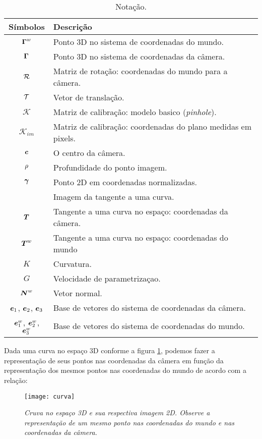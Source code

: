 \begin{table}[!h]
\begin{center}
\begin{tabular}{|c|l|}
\hline
Símbolos&Descrição\\\hline\hline
$\boldsymbol{\Gamma}^w$&Ponto 3D no sistema de coordenadas do mundo.\\\hline
$\boldsymbol{\Gamma}$&Ponto 3D no sistema de coordenadas da câmera.\\\hline
$\mathcal{R}$&Matriz de rotação: coordenadas do mundo para a câmera.\\\hline
$\mathcal{T}$&Vetor de translação.\\\hline
$\mathcal K$&Matriz de calibração: modelo basico (\textit{pinhole}).\\\hline
$\mathcal K_{im}$&Matriz de calibração: coordenadas do plano medidas em pixels.\\\hline
$\boldsymbol{c}$&O centro da câmera.\\\hline
$\rho$&Profundidade do ponto imagem.\\\hline
$\boldsymbol{\gamma}$&Ponto 2D em coordenadas normalizadas.\\\hline
&Imagem da tangente a uma curva.\\\hline
$\boldsymbol{T}$&Tangente a uma curva no espaço: coordenadas da câmera.\\\hline
$\boldsymbol{T}^w$&Tangente a uma curva no espaço: coordenadas do mundo\\\hline
$K$&Curvatura.\\\hline
$G$&Velocidade de parametrizaçao.\\\hline
$\boldsymbol{N}^w$&Vetor normal.\\\hline
$\boldsymbol{e}_1$, $\boldsymbol{e}_2$, $\boldsymbol{e}_3$&Base de vetores do sistema de coordenadas da câmera.\\\hline
$\boldsymbol{e}_1^w$, $\boldsymbol{e}_2^w$, $\boldsymbol{e}_3^w$&Base de vetores do sistema de coordenadas do mundo.\\\hline
\end{tabular}
\end{center}
\caption{Notação.}
\label{tab_not}
\end{table}

Dada uma curva no espaço 3D conforme a figura \ref{curva_3D}, podemos fazer a representação de seus pontos nas coordenadas da câmera em função da representação dos mesmos pontos nas coordenadas do mundo de acordo com a relação:

\begin{figure}[!htb]
\centering
\texttt{[image: curva]}
\caption{\textit{Cruva no espaço 3D e sua respectiva imagem 2D. Observe a representação de um mesmo ponto nas coordenadas do mundo e nas coordenadas da câmera.}}
\label{curva_3D}
\end{figure}



